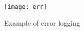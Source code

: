 \begin{slide}
    \begin{figure}[H]
        \centering
        \texttt{[image: err]}
        \caption{Example of error logging}
    \end{figure}
\end{slide}
